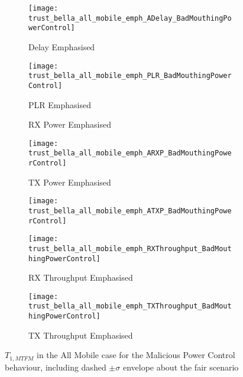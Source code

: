 \begin{figure}[h]
	\centering
	\begin{subfigure}{0.5\textwidth}
		\texttt{[image: trust\_bella\_all\_mobile\_emph\_ADelay\_BadMouthingPowerControl]} \label{fig:all_mobile_badmouthing_delay}
		\caption{Delay Emphasised}
	\end{subfigure}
	\begin{subfigure}{0.5\textwidth}
		\texttt{[image: trust\_bella\_all\_mobile\_emph\_PLR\_BadMouthingPowerControl]}
		\label{fig:all_mobile_badmouthing_plr}
		\caption{PLR Emphasised}
	\end{subfigure}
	
	\begin{subfigure}{0.5\textwidth}
		\caption{RX Power Emphasised}
		\texttt{[image: trust\_bella\_all\_mobile\_emph\_ARXP\_BadMouthingPowerControl]} 
		\label{fig:all_mobile_badmouthing_rxp}
		\caption{TX Power Emphasised}
	\end{subfigure}	
	\begin{subfigure}{0.5\textwidth}
		\texttt{[image: trust\_bella\_all\_mobile\_emph\_ATXP\_BadMouthingPowerControl]}
		\label{fig:all_mobile_badmouthing_txp}
	\end{subfigure}
	
	\begin{subfigure}{0.5\textwidth}
		\caption{RX Throughput Emphasised}
		\texttt{[image: trust\_bella\_all\_mobile\_emph\_RXThroughput\_BadMouthingPowerControl]} \label{fig:all_mobile_badmouthing_rxthroughput}
	\end{subfigure}
	\begin{subfigure}{0.5\textwidth}
		\caption{TX Throughput Emphasised}
		\texttt{[image: trust\_bella\_all\_mobile\_emph\_TXThroughput\_BadMouthingPowerControl]} \label{fig:all_mobile_badmouthing_txthroughput}
	\end{subfigure}
	\caption{$T_{1,MTFM}$ in the All Mobile case for the Malicious Power Control behaviour, including dashed $\pm\sigma$ envelope about the fair scenario}
	\label{fig:all_mobile_badmouthing}
\end{figure}
%
